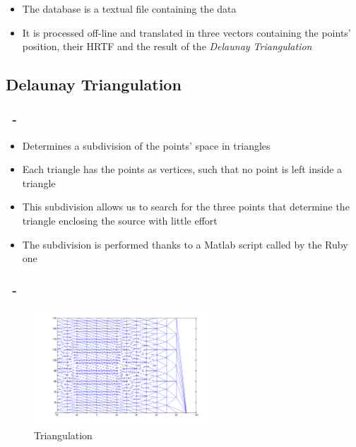 \documentclass{beamer}
\begin{document}
	\begin{frame}
		\frametitle{\insertsection}
		\begin{itemize}
			\item The database is a textual file containing the data
			\item It is processed off-line and translated in three vectors containing the
              points' position, their \textsc{HRTF} and the result of the {\em Delaunay Triangulation}
		\end{itemize}
	\end{frame}

	\subsection{Delaunay Triangulation}

	\begin{frame}
		\frametitle{\insertsection\ - \insertsubsection}
		\begin{itemize}
			\item Determines a subdivision of the points' space in triangles
			\item Each triangle has the points as vertices, such that no point is left inside a triangle
			\item This subdivision allows us to search for the three points that determine the triangle enclosing the
				source with little effort
			\item The subdivision is performed thanks to a Matlab script called by the Ruby one
		\end{itemize}
	\end{frame}

	\begin{frame}
		\frametitle{\insertsection\ - \insertsubsection}
		\begin{figure}
			\centering
			  \includegraphics[width=0.6\textwidth]{images/triangulation.png}
			  \caption{Triangulation}
		\end{figure}
	\end{frame}
\end{document}
